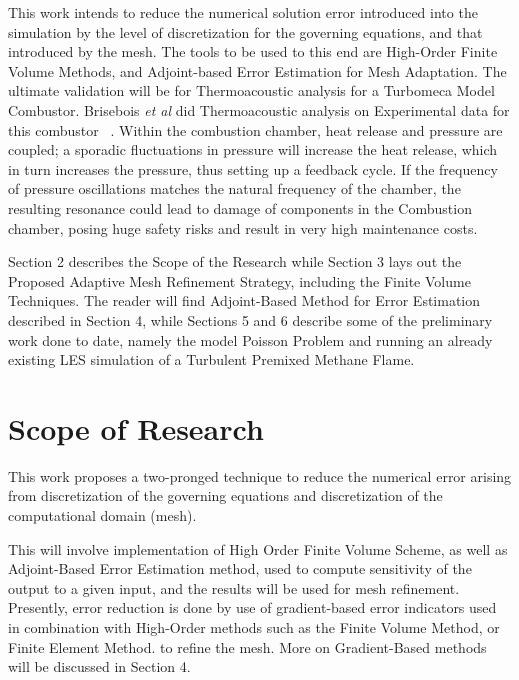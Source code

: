 \documentclass[titlepage,11pt,letterpaper]{article}
\begin{document}
This work intends to reduce the numerical solution error introduced into the simulation by the level of discretization for the governing equations, and that introduced by the mesh. The tools to be used to this end are High-Order Finite Volume Methods, and Adjoint-based Error Estimation for Mesh Adaptation. The ultimate validation will be for Thermoacoustic analysis  for a Turbomeca Model Combustor. Brisebois \textit{et al} did Thermoacoustic analysis on Experimental data for this combustor ~\cite{Brisebois:2014}. Within the combustion chamber, heat release and pressure are coupled; a sporadic fluctuations in pressure will increase the heat release, which in turn increases the pressure, thus setting up a feedback cycle. If the frequency of pressure oscillations matches the natural frequency of the chamber, the resulting resonance could lead to damage of components in the Combustion chamber, posing huge safety risks and result in very high maintenance costs.\par

Section 2 describes the Scope of the Research while Section 3 lays out the Proposed Adaptive Mesh Refinement Strategy, including the Finite Volume Techniques. The reader will find Adjoint-Based Method for Error Estimation described in Section 4, while Sections 5 and 6 describe some of the preliminary work done to date, namely the model Poisson Problem and running an already existing LES simulation of a Turbulent Premixed Methane Flame. \par

\section{Scope of Research}
This work proposes a two-pronged technique to reduce the numerical error arising from discretization of the governing equations and discretization of the computational domain (mesh).\par

This will involve implementation of High Order Finite Volume Scheme, as well as Adjoint-Based Error Estimation method, used to compute sensitivity of the output to a given input, and the results will be used for mesh refinement. Presently, error reduction is done by use of gradient-based error indicators used in combination with High-Order methods such as the Finite Volume Method, or Finite Element Method. to refine the mesh. More on Gradient-Based methods will be discussed in Section 4. \par
\end{document}
